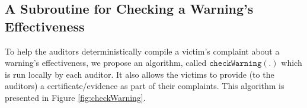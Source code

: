 
\vspace{-4mm}

\subsection{A Subroutine for Checking a Warning's Effectiveness}
\vspace{-1mm}


To help the auditors deterministically compile a victim's complaint about a warning's effectiveness, we propose an algorithm,  called $\mathtt{checkWarning}(.)$ which is run locally by each auditor. It also allows the victims to provide (to the auditors) a certificate/evidence as part of their complaints.   This algorithm is presented in Figure \ref{fig:checkWarning}.




